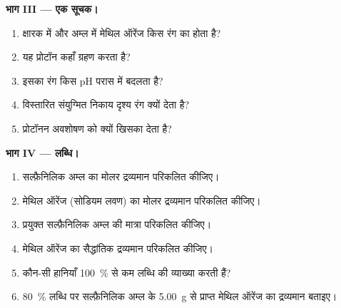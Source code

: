 \begin{problem}
\medskip
\noindent\textbf{भाग III --- एक सूचक।}
\begin{enumerate}[resume]
  \item क्षारक में और अम्ल में मेथिल ऑरेंज किस रंग का होता है?
  \item यह प्रोटॉन कहाँ ग्रहण करता है?
  \item इसका रंग किस pH परास में बदलता है?
  \item विस्तारित संयुग्मित निकाय दृश्य रंग क्यों देता है?
  \item प्रोटॉनन अवशोषण को क्यों खिसका देता है?
\end{enumerate}

\medskip
\noindent\textbf{भाग IV --- लब्धि।}
\begin{enumerate}[resume]
  \item सल्फ़ैनिलिक अम्ल का मोलर द्रव्यमान परिकलित कीजिए।
  \item मेथिल ऑरेंज (सोडियम लवण) का मोलर द्रव्यमान परिकलित कीजिए।
  \item प्रयुक्त सल्फ़ैनिलिक अम्ल की मात्रा परिकलित कीजिए।
  \item मेथिल ऑरेंज का सैद्धांतिक द्रव्यमान परिकलित कीजिए।
  \item कौन-सी हानियाँ 100~\% से कम लब्धि की व्याख्या करती हैं?
  \item 80~\% लब्धि पर सल्फ़ैनिलिक अम्ल के \qty{5.00}{g} से प्राप्त मेथिल ऑरेंज का द्रव्यमान
        बताइए।
\end{enumerate}
\end{problem}
